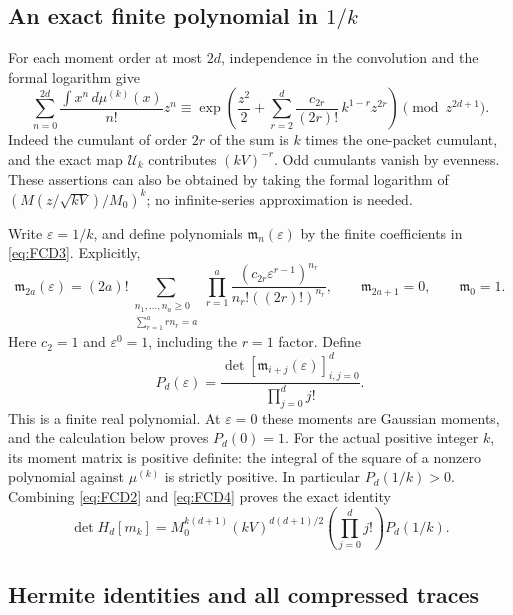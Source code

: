 \documentclass[11pt]{article}
\begin{document}
\subsection{An exact finite polynomial in \(1/k\)}

For each moment order at most \(2d\), independence in the convolution and
the formal logarithm give
\begin{equation}
 \sum_{n=0}^{2d}\frac{\int x^n\,d\mu^{(k)}(x)}{n!}z^n
 \equiv
 \exp\left(\frac{z^2}{2}
       +\sum_{r=2}^{d}\frac{c_{2r}}{(2r)!}\,
                    k^{1-r}z^{2r}\right)\pmod {z^{2d+1}}.
 \tag{FCD3}\label{eq:FCD3}
\end{equation}
Indeed the cumulant of order \(2r\) of the sum is \(k\) times the
one-packet cumulant, and the exact map \(\mathcal U_k\) contributes
\((kV)^{-r}\). Odd cumulants vanish by evenness. These assertions can
also be obtained by taking the formal logarithm of
\((M(z/\sqrt{kV})/M_0)^k\); no infinite-series approximation is needed.

Write \(\varepsilon=1/k\), and define polynomials \(\mathfrak m_n(\varepsilon)\)
by the finite coefficients in \eqref{eq:FCD3}. Explicitly,
\[
 \mathfrak m_{2a}(\varepsilon)
 =(2a)!\!
 \sum_{\substack{n_1,\ldots,n_a\ge0\\
                         \sum_{r=1}^a r n_r=a}}
 \prod_{r=1}^a
  \frac{(c_{2r}\varepsilon^{r-1})^{n_r}}
       {n_r!((2r)!)^{n_r}},
 \qquad \mathfrak m_{2a+1}=0,\qquad \mathfrak m_0=1.
\]
Here \(c_2=1\) and \(\varepsilon^0=1\), including the \(r=1\) factor.
Define
\begin{equation}
 P_d(\varepsilon)=
 \frac{\det[\mathfrak m_{i+j}(\varepsilon)]_{i,j=0}^{d}}
      {\prod_{j=0}^d j!}.
 \tag{FCD4}\label{eq:FCD4}
\end{equation}
This is a finite real polynomial. At \(\varepsilon=0\) these moments are
Gaussian moments, and the calculation below proves \(P_d(0)=1\).
For the actual positive integer \(k\), its moment matrix is positive
definite: the integral of the square of a nonzero polynomial against
\(\mu^{(k)}\) is strictly positive. In particular \(P_d(1/k)>0\).
Combining \eqref{eq:FCD2} and \eqref{eq:FCD4} proves the exact identity
\begin{equation}
 \boxed{\displaystyle
 \det H_d[m_k]=M_0^{k(d+1)}(kV)^{d(d+1)/2}
                    \left(\prod_{j=0}^d j!\right)P_d(1/k).}
 \tag{FCD5}\label{eq:FCD5}
\end{equation}

\subsection{Hermite identities and all compressed traces}
\end{document}
